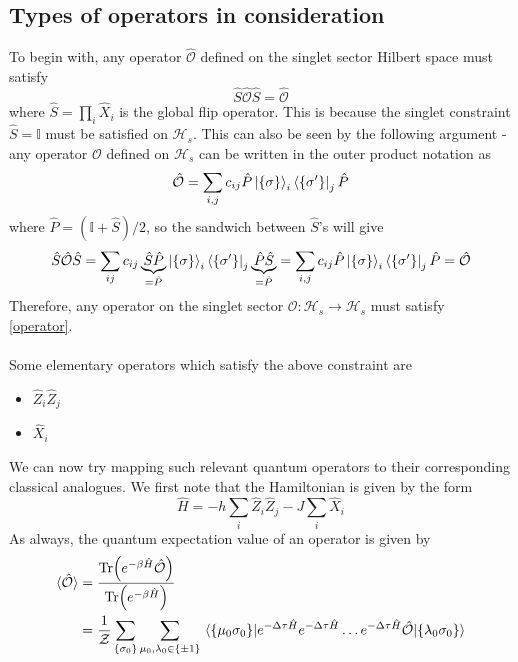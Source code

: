 \documentclass[../thesis_main.tex]{subfiles}
\begin{document}
\subsection{Types of operators in consideration}
To begin with, any operator $\hat{\mathcal{O}}$ defined on the singlet sector Hilbert space must satisfy 
\begin{equation}
    \hat{S} \hat{\mathcal{O}} \hat{S} = \hat{\mathcal{O}}
    \label{operator}
\end{equation}
where $\hat{S} = \prod_i \hat{X}_i$ is the global flip operator. This is because the singlet constraint $\hat{S} = \mathbb{I}$ must be satisfied on $\mathcal{H}_s$. This can also be seen by the following argument - any operator $\mathcal{O}$ defined on $\mathcal{H}_s$ can be written in the outer product notation as 
\[
    \hat{\mathcal{O}} = \sum_{i,j} c_{ij} \hat{P}\ket{\{\sigma\}}_i \bra{\{\sigma '\}}_j \hat{P}
\]     
where $\hat{P} = (\mathbb{I} + \hat{S})/2$, so the sandwich between $\hat{S}$'s will give 
\begin{equation*}
    \hat{S} \hat{\mathcal{O}} \hat{S} = \sum_{ij} c_{ij} \underbrace{\hat{S}\hat{P}}_{ = \hat{P}} \ket{\{\sigma\}}_i \bra{\{\sigma '\}}_j \underbrace{\hat{P} \hat{S}}_{ = \hat{P}} = \sum_{i,j} c_{ij} \hat{P}\ket{\{\sigma\}}_i \bra{\{\sigma '\}}_j \hat{P} = \hat{\mathcal{O}}
\end{equation*}
Therefore, any operator on the singlet sector $\mathcal{O}: \mathcal{H}_s \to \mathcal{H}_s$ must satisfy  \eqref{operator}.~\\~\\
Some elementary operators which satisfy the above constraint are 
\begin{itemize}
    \setlength{\itemsep}{0.1em}
    \item $\hat{Z}_i \hat{Z}_j$
    \item $\hat{X}_i$   
\end{itemize} 
We can now try mapping such relevant quantum operators to their corresponding classical analogues.  
We first note that the Hamiltonian is given by the form 
\[
    \hat{H} = - h \sum_i \hat{Z}_i \hat{Z}_j - J \sum_i \hat{X}_i 
\]
As always, the quantum expectation value of an operator is given by 
\begin{align*}
    \langle {\hat{\mathcal{O}}} \rangle  &= \frac{\Tr(e^{-\beta \hat{H}}\hat{\mathcal{O}})}{\Tr(e^{-\beta \hat{H}})} \\
    &= \frac{1}{\mathcal{Z}} \sum_{\{\sigma_0 \}} \sum_{\mu_0, \lambda_0 \in \{\pm 1\}} \mel{\{\mu_0 \sigma _0\}}{e^{-\Delta \tau \hat{H}} e^{-\Delta \tau \hat{H}} \ldots e^{-\Delta \tau \hat{H}} \hat{\mathcal{O}}}{\{\lambda_0 \sigma _0\}}    
\end{align*}
\end{document}
